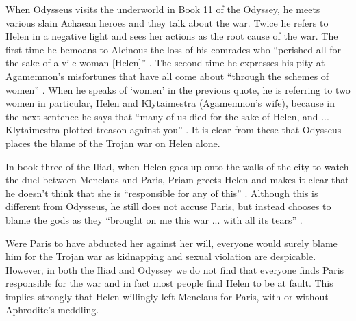 \documentclass[11pt]{article}
\begin{document}
When Odysseus visits the underworld in Book 11 of the Odyssey, he meets various slain Achaean heroes and they talk about the war.
Twice he refers to Helen in a negative light and sees her actions as the root cause of the war.
The first time he bemoans to Alcinous the loss of his comrades who ``perished all for the sake of a vile woman [Helen]'' \cite[book 11, line 384]{odyssey}.
The second time he expresses his pity at Agamemnon's misfortunes that have all come about ``through the schemes of women'' \cite[book 11, line 438]{odyssey}.
When he speaks of `women' in the previous quote, he is referring to two women in particular, Helen and Klytaimestra (Agamemnon's wife), because in the next sentence he says that ``many of us died for the sake of Helen, and ... Klytaimestra plotted treason against you'' \cite[book 11, line 438]{odyssey}.
It is clear from these that Odysseus places the blame of the Trojan war on Helen alone.

In book three of the Iliad, when Helen goes up onto the walls of the city to watch the duel between Menelaus and Paris, Priam greets Helen and makes it clear that he doesn't think that she is ``responsible for any of this'' \cite[book 3, line 164]{iliad}.
Although this is different from Odysseus, he still does not accuse Paris, but instead chooses to blame the gods as they ``brought on me this war ... with all its tears'' \cite[book 3, line 165]{iliad}.

Were Paris to have abducted her against her will, everyone would surely blame him for the Trojan war as kidnapping and sexual violation are despicable.
However, in both the Iliad and Odyssey we do not find that everyone finds Paris responsible for the war and in fact most people find Helen to be at fault.
This implies strongly that Helen willingly left Menelaus for Paris, with or without Aphrodite's meddling.







\end{document}
